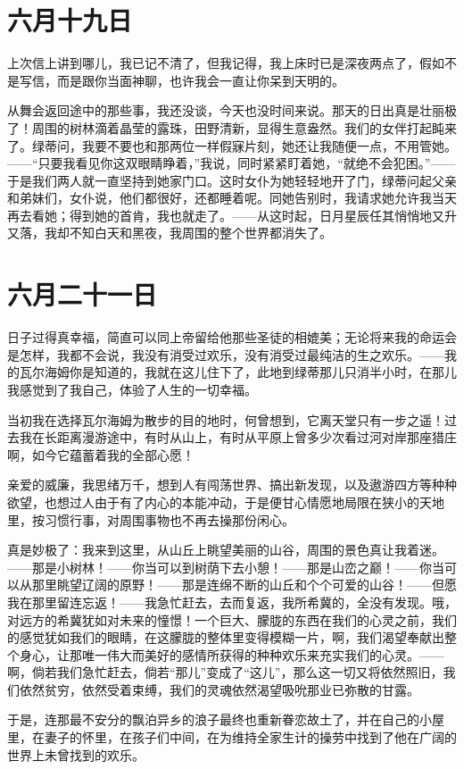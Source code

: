 \documentclass[12pt,oneside]{book}
\begin{document}
\chapter{六月十九日}
\label{sec-2-12}
上次信上讲到哪儿，我已记不清了，但我记得，我上床时已是深夜两点了，假如不是写信，而是跟你当面神聊，也许我会一直让你呆到天明的。

从舞会返回途中的那些事，我还没谈，今天也没时间来说。那天的日出真是壮丽极了！周围的树林滴着晶莹的露珠，田野清新，显得生意盎然。我们的女伴打起盹来了。绿蒂问，我要不要也和那两位一样假寐片刻，她还让我随便一点，不用管她。——“只要我看见你这双眼睛睁着，”我说，同时紧紧盯着她，“就绝不会犯困。”——于是我们两人就一直坚持到她家门口。这时女仆为她轻轻地开了门，绿蒂问起父亲和弟妹们，女仆说，他们都很好，还都睡着呢。同她告别时，我请求她允许我当天再去看她；得到她的首肯，我也就走了。——从这时起，日月星辰任其悄悄地又升又落，我却不知白天和黑夜，我周围的整个世界都消失了。

\chapter{六月二十一日}
\label{sec-2-13}
日子过得真幸福，简直可以同上帝留给他那些圣徒的相媲美；无论将来我的命运会是怎样，我都不会说，我没有消受过欢乐，没有消受过最纯洁的生之欢乐。——我的瓦尔海姆你是知道的，我就在这儿住下了，此地到绿蒂那儿只消半小时，在那儿我感觉到了我自己，体验了人生的一切幸福。

当初我在选择瓦尔海姆为散步的目的地时，何曾想到，它离天堂只有一步之遥！过去我在长距离漫游途中，有时从山上，有时从平原上曾多少次看过河对岸那座猎庄啊，如今它蕴蓄着我的全部心愿！

亲爱的威廉，我思绪万千，想到人有闯荡世界、搞出新发现，以及遨游四方等种种欲望，也想过人由于有了内心的本能冲动，于是便甘心情愿地局限在狭小的天地里，按习惯行事，对周围事物也不再去操那份闲心。

真是妙极了：我来到这里，从山丘上眺望美丽的山谷，周围的景色真让我着迷。——那是小树林！——你当可以到树荫下去小憩！——那是山峦之巅！——你当可以从那里眺望辽阔的原野！——那是连绵不断的山丘和个个可爱的山谷！——但愿我在那里留连忘返！——我急忙赶去，去而复返，我所希冀的，全没有发现。哦，对远方的希冀犹如对未来的憧憬！一个巨大、朦胧的东西在我们的心灵之前，我们的感觉犹如我们的眼睛，在这朦胧的整体里变得模糊一片，啊，我们渴望奉献出整个身心，让那唯一伟大而美好的感情所获得的种种欢乐来充实我们的心灵。——啊，倘若我们急忙赶去，倘若“那儿”变成了“这儿”，那么这一切又将依然照旧，我们依然贫穷，依然受着束缚，我们的灵魂依然渴望吸吮那业已弥散的甘露。

于是，连那最不安分的飘泊异乡的浪子最终也重新眷恋故土了，并在自己的小屋里，在妻子的怀里，在孩子们中间，在为维持全家生计的操劳中找到了他在广阔的世界上未曾找到的欢乐。
\end{document}
